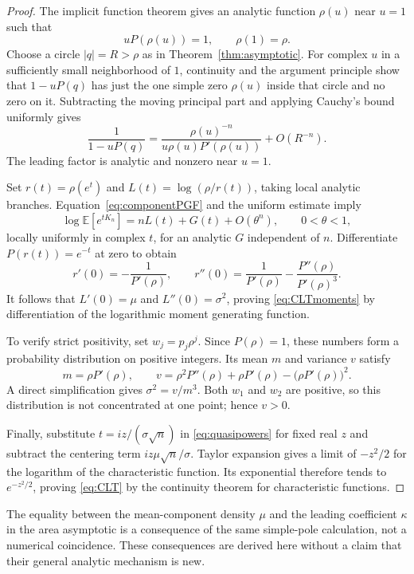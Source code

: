 \documentclass[11pt,letterpaper]{article}
\numberwithin{equation}{section}
\theoremstyle{definition}
\newcommand{\E}{\mathbb E}
\begin{document}
\begin{proof}
The implicit function theorem gives an analytic function $\rho(u)$ near
$u=1$ such that
\[
 uP(\rho(u))=1,\qquad \rho(1)=\rho.
\]
Choose a circle $|q|=R>\rho$ as in Theorem~\ref{thm:asymptotic}. For
complex $u$ in a sufficiently small neighborhood of $1$, continuity and
the argument principle show that $1-uP(q)$ has just the one simple zero
$\rho(u)$ inside that circle and no zero on it. Subtracting the moving
principal part and applying Cauchy's bound uniformly gives
\begin{equation}
 [q^n]\frac{1}{1-uP(q)}
 =\frac{\rho(u)^{-n}}{u\rho(u)P'(\rho(u))}+O(R^{-n}).
 \label{eq:uniformpole}
\end{equation}
The leading factor is analytic and nonzero near $u=1$.

Set $r(t)=\rho(e^t)$ and $L(t)=\log(\rho/r(t))$, taking local analytic
branches. Equation~\eqref{eq:componentPGF} and the uniform estimate imply
\begin{equation}
 \log\E[e^{tK_n}]=nL(t)+G(t)+O(\theta^n),\qquad 0<\theta<1,
 \label{eq:quasipowers}
\end{equation}
locally uniformly in complex $t$, for an analytic $G$ independent of $n$.
Differentiate $P(r(t))=e^{-t}$ at zero to obtain
\[
 r'(0)=-\frac{1}{P'(\rho)},\qquad
 r''(0)=\frac{1}{P'(\rho)}-
        \frac{P''(\rho)}{P'(\rho)^3}.
\]
It follows that $L'(0)=\mu$ and $L''(0)=\sigma^2$, proving
\eqref{eq:CLTmoments} by differentiation of the logarithmic moment
generating function.

To verify strict positivity, set $w_j=p_j\rho^j$. Since $P(\rho)=1$, these
numbers form a probability distribution on positive integers. Its mean
$m$ and variance $v$ satisfy
\[
 m=\rho P'(\rho),\qquad
 v=\rho^2P''(\rho)+\rho P'(\rho)-\bigl(\rho P'(\rho)\bigr)^2.
\]
A direct simplification gives $\sigma^2=v/m^3$. Both $w_1$ and $w_2$ are
positive, so this distribution is not concentrated at one point; hence
$v>0$.

Finally, substitute $t=iz/(\sigma\sqrt n)$ in
\eqref{eq:quasipowers} for fixed real $z$ and subtract the centering term
$iz\mu\sqrt n/\sigma$. Taylor expansion gives a limit of $-z^2/2$ for the
logarithm of the characteristic function. Its exponential therefore tends
to $e^{-z^2/2}$, proving \eqref{eq:CLT} by the continuity theorem for
characteristic functions.
\end{proof}

The equality between the mean-component density $\mu$ and the leading
coefficient $\kappa$ in the area asymptotic is a consequence of the same
simple-pole calculation, not a numerical coincidence. These consequences
are derived here without a claim that their general analytic mechanism is
new.
\end{document}
